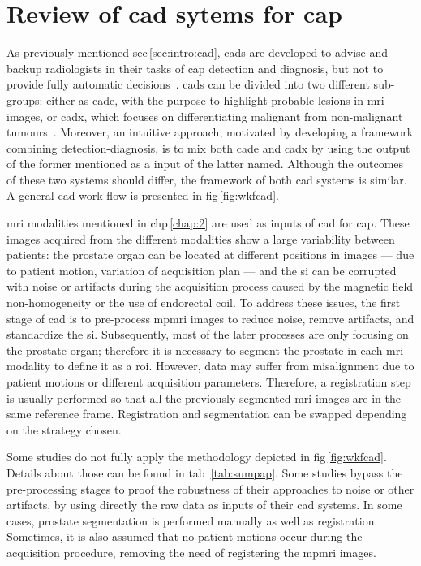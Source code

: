 \section{Review of \acs*{cad} sytems for \ac{cap}}\label{chap:3}
\graphicspath{{3_review/figures/}}



As previously mentioned \acs{sec}\,\ref{sec:intro:cad}, \acp{cad} are developed
to advise and backup radiologists in their tasks of \ac{cap} detection and
diagnosis, but not to provide fully automatic decisions~\cite{Giger2008}.
\acp{cad} can be divided into two different sub-groups: either as \ac{cade},
with the purpose to highlight probable lesions in \ac{mri} images, or
\ac{cadx}, which focuses on differentiating malignant from non-malignant
tumours~\cite{Giger2008}.
Moreover, an intuitive approach, motivated by developing a framework combining
detection-diagnosis, is to mix both \ac{cade} and \ac{cadx} by using the output
of the former mentioned as a input of the latter named.
Although the outcomes of these two systems should differ, the framework of both
\ac{cad} systems is similar.
A general \ac{cad} work-flow is presented in \acs{fig}\,\ref{fig:wkfcad}.

\ac{mri} modalities mentioned in \acs{chp}\,\ref{chap:2} are used as inputs of
\ac{cad} for \ac{cap}.
These images acquired from the different modalities show a large variability
between patients: the prostate organ can be located at different positions in
images --- due to patient motion, variation of acquisition plan --- and the
\ac{si} can be corrupted with noise or artifacts during the acquisition process
caused by the magnetic field non-homogeneity or the use of endorectal coil.
To address these issues, the first stage of \ac{cad} is to pre-process
\ac{mpmri} images to reduce noise, remove artifacts, and standardize the
\ac{si}.
Subsequently, most of the later processes are only focusing on the prostate
organ; therefore it is necessary to segment the prostate in each \ac{mri}
modality to define it as a \ac{roi}.
However, data may suffer from misalignment due to patient motions or different
acquisition parameters.
Therefore, a registration step is usually performed so that all the previously
segmented \ac{mri} images are in the same reference frame.
Registration and segmentation can be swapped depending on the strategy chosen.

Some studies do not fully apply the methodology depicted in
\acs{fig}\,\ref{fig:wkfcad}.
Details about those can be found in \acs{tab}~\ref{tab:sumpap}.
Some studies bypass the pre-processing stages to proof the robustness of their
approaches to noise or other artifacts, by using directly the raw data as
inputs of their \ac{cad} systems.
In some cases, prostate segmentation is performed manually as well as
registration.
Sometimes, it is also assumed that no patient motions occur during the
acquisition procedure, removing the need of registering the \ac{mpmri} images.

